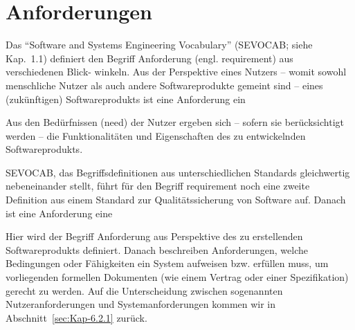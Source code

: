 \section{Anforderungen}
\label{sec:Kap-6.2}

Das "`Software and Systems Engineering Vocabulary"' (SEVOCAB; siehe Kap.~1.1) %
definiert den Begriff Anforderung (engl. requirement) aus verschiedenen Blick-
\linebreak %
winkeln. Aus der Perspektive eines Nutzers -- womit sowohl menschliche Nutzer als auch andere Softwareprodukte gemeint sind -- eines (zukünftigen) Softwareprodukts ist eine Anforderung ein


\vspace{3mm} %

Aus den Bedürfnissen (need) der Nutzer ergeben sich -- sofern sie berücksichtigt werden -- die Funktionalitäten und Eigenschaften des zu entwickelnden Software\-produkts.

SEVOCAB, das Begriffsdefinitionen aus unterschiedlichen Standards gleichwertig nebeneinander stellt, führt für den Begriff requirement noch eine zweite Defini\-tion aus einem Standard zur Qualitätssicherung von Software auf. Danach ist eine Anforderung eine


\vspace{3mm} %

Hier wird der Begriff Anforderung aus Perspektive des zu erstellenden Softwareprodukts definiert. Danach beschreiben Anforderungen, welche Bedingungen oder Fähigkeiten ein System aufweisen bzw. erfüllen muss, um vorliegenden formellen Dokumenten (wie einem Vertrag oder einer Spezifikation) gerecht zu werden. Auf die Unterscheidung zwischen sogenannten Nutzeranforderungen und Systemanforderungen kommen wir in Abschnitt~\ref{sec:Kap-6.2.1} zurück.


